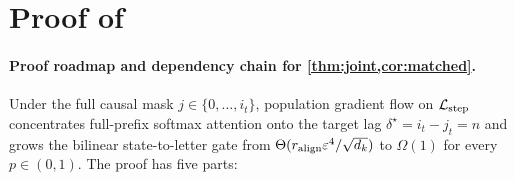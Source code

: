 \section{Proof of \texorpdfstring{}{Theorem 2}}
\label{app:joint}
\label{app:routing}

\paragraph{Proof roadmap and dependency chain for \cref{thm:joint,cor:matched}.}
Under the full causal mask $j \in \{0, \ldots, i_t\}$, population gradient flow on $\mathcal L_{\mathrm{step}}$ concentrates full-prefix softmax attention onto the target lag $\delta^\star = i_t - j_t = n$ and grows the bilinear state-to-letter gate from $\Theta(r_{\mathrm{align}}\varepsilon^4/\sqrt{d_k})$ to $\Omega(1)$ for every $p \in (0,1)$.\label{tab:J-phases} The proof has five parts:
